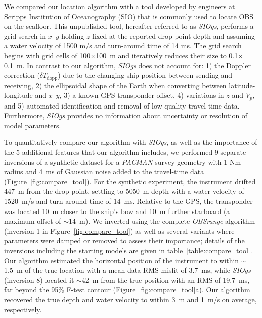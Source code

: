 We compared our location algorithm with a tool developed by engineers at Scripps Institution of Oceanography (SIO) that is commonly used to locate OBS on the seafloor. This unpublished tool, hereafter referred to as \textit{SIOgs}, performs a grid search in $x$--$y$ holding $z$ fixed at the reported drop-point depth and assuming a water velocity of 1500 m/s and turn-around time of 14 ms. The grid search begins with grid cells of 100$\times$100~m and iteratively reduces their size to 0.1$\times$0.1~m. In contrast to our algorithm, \textit{SIOgs} does not account for: 1) the Doppler correction ($\delta T_{\text{dopp}}$) due to the changing ship position between sending and receiving, 2) the ellipsoidal shape of the Earth when converting between latitude-longitude and $x$--$y$, 3) a known GPS-transponder offset, 4) variations in $z$ and $V_p$, and 5) automated identification and removal of low-quality travel-time data. Furthermore, \textit{SIOgs} provides no information about uncertainty or resolution of model parameters.  

To quantitatively compare our algorithm with \textit{SIOgs}, as well as the importance of the 5 additional features that our algorithm includes, we performed 9 separate inversions of a synthetic dataset for a \textit{PACMAN} survey geometry with 1 Nm radius and 4~ms of Gaussian noise added to the travel-time data (Figure~\ref{fig:compare_tool}). For the synthetic experiment, the instrument drifted 447~m from the drop point, settling to 5050~m depth with a water velocity of 1520~m/s and turn-around time of 14~ms. Relative to the GPS, the transponder was located 10~m closer to the ship's bow and 10~m further starboard (a maximum offset of $\sim$14~m). We inverted using the complete \textit{OBSrange} algorithm (inversion 1 in Figure~\ref{fig:compare_tool}) as well as several variants where parameters were damped or removed to assess their importance; details of the inversions including the starting models are given in table~\ref{table:compare_tool}. Our algorithm estimated the horizontal position of the instrument to within $\sim$1.5~m of the true location with a mean data RMS misfit of 3.7~ms, while \textit{SIOgs} (inversion 8) located it $\sim$42~m from the true position with an RMS of 19.7~ms, far beyond the 95\% F-test contour (Figure~\ref{fig:compare_tool}a). Our algorithm recovered the true depth and water velocity to within 3~m and 1~m/s on average, respectively.


